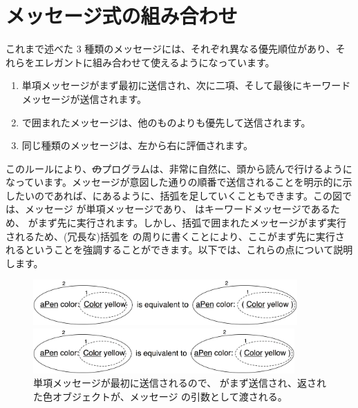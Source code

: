 \documentclass[a4paper,10pt,twoside]{book}
\begin{document}

\section{メッセージ式の組み合わせ}
これまで述べた 3 種類のメッセージには、それぞれ異なる優先順位があり、それらをエレガントに組み合わせて使えるようになっています。

\begin{enumerate}
\item 単項メッセージがまず最初に送信され、次に二項、そして最後にキーワードメッセージが送信されます。
\item {}で囲まれたメッセージは、他のものよりも優先して送信されます。
\item 同じ種類のメッセージは、左から右に評価されます。
\end{enumerate}

このルールにより、\st のプログラムは、非常に自然に、頭から読んで行けるようになっています。メッセージが意図した通りの順番で送信されることを明示的に示したいのであれば、にあるように、括弧を足していくこともできます。この図では、メッセージ  が単項メッセージであり、 はキーワードメッセージであるため、 がまず先に実行されます。しかし、括弧で囲まれたメッセージがまず実行されるため、(冗長な)括弧を  の周りに書くことにより、ここがまず先に実行されるということを強調することができます。以下では、これらの点について説明します。

\begin{figure}[ht]
\ifluluelse
	{\centerline{\includegraphics[width=0.9\textwidth]{uKeyUn}} }
	{\centerline{\includegraphics[width=10cm]{uKeyUn}} }
\caption{単項メッセージが最初に送信されるので、 がまず送信され、返された色オブジェクトが、メッセージ  の引数として渡される。}
\end{figure}
\end{document}
